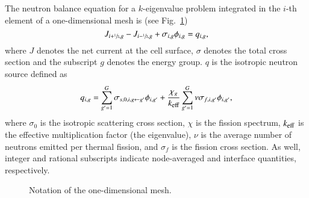 The neutron balance equation for a $k$-eigenvalue problem integrated in the $i$-th element of a one-dimensional mesh is (see Fig.~\ref{fig:mesh1D})
\begin{equation}
  \label{eq:balance}
  J_{i+\sfrac{1}{2},g} - J_{i-\sfrac{1}{2},g} + \sigma_{i,g} \phi_{i,g} = q_{i,g},
\end{equation}
where $J$ denotes the net current at the cell surface, $\sigma$ denotes the total cross section and the subscript $g$ denotes the energy group. $q$ is the isotropic neutron source defined as
\begin{equation}
  \label{eq:qsrc}
  q_{i,g} = \sum\limits_{g'=1}^G\sigma_{s,0,i,g\leftarrow g'}\phi_{i,g'} +
  \frac{\chi_g}{\keff}\sum\limits_{g'=1}^G\nu\sigma_{f,i,g'}\phi_{i,g'},
\end{equation}
where $\sigma_0$ is the isotropic scattering cross section, $\chi$ is the fission spectrum, $\keff$ is the effective multiplication factor (the eigenvalue), $\nu$ is the average number of neutrons emitted per thermal fission, and $\sigma_f$ is the fission cross section. As well, integer and rational subscripts indicate node-averaged and interface quantities, respectively.
%
\begin{figure}[htbp]
  \centering
  
  \caption{Notation of the one-dimensional mesh.}
  \label{fig:mesh1D}
\end{figure}


